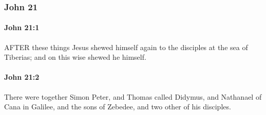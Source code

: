 	\subsubsection{John 21} %
		\label{JOHN-21}
		
		\paragraph{John 21:1} %
			\label{JOHN-21-1}

			AFTER these things Jesus shewed himself again to the disciples at the sea of Tiberias; and on this wise shewed he himself.

			\begin{framed}
				\scriptsize
				\begin{compactdesc}
					\item[SBLG] 
				\end{compactdesc}
			\end{framed}

		\paragraph{John 21:2} %
			\label{JOHN-21-2}

			There were together Simon Peter, and Thomas called Didymus, and Nathanael of Cana in Galilee, and the sons of Zebedee, and two other of his disciples.

